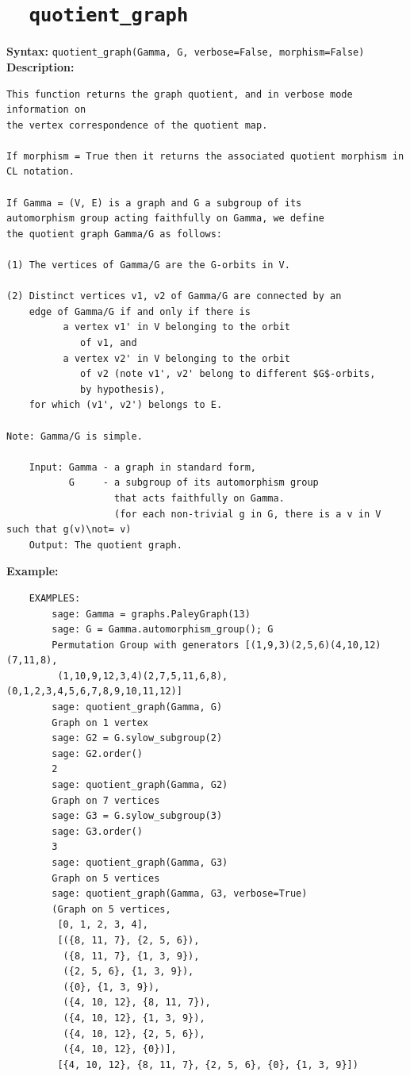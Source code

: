 \documentclass{article}
\begin{document}
\section{\tt \ \ quotient\_graph}

\textbf{Syntax:} \verb}quotient_graph(Gamma, G, verbose=False, morphism=False)}\\

\textbf{Description:}
\begin{verbatim}
This function returns the graph quotient, and in verbose mode information on 
the vertex correspondence of the quotient map.

If morphism = True then it returns the associated quotient morphism in CL notation.

If Gamma = (V, E) is a graph and G a subgroup of its 
automorphism group acting faithfully on Gamma, we define 
the quotient graph Gamma/G as follows:
    
(1) The vertices of Gamma/G are the G-orbits in V. 
    
(2) Distinct vertices v1, v2 of Gamma/G are connected by an 
    edge of Gamma/G if and only if there is 
          a vertex v1' in V belonging to the orbit 
             of v1, and 
          a vertex v2' in V belonging to the orbit 
             of v2 (note v1', v2' belong to different $G$-orbits,
             by hypothesis), 
    for which (v1', v2') belongs to E.
    
Note: Gamma/G is simple.
    
    Input: Gamma - a graph in standard form,
           G     - a subgroup of its automorphism group
                   that acts faithfully on Gamma.
                   (for each non-trivial g in G, there is a v in V such that g(v)\not= v)
    Output: The quotient graph.
\end{verbatim}

\textbf{Example:}
\begin{verbatim}
    EXAMPLES:
        sage: Gamma = graphs.PaleyGraph(13)
        sage: G = Gamma.automorphism_group(); G
        Permutation Group with generators [(1,9,3)(2,5,6)(4,10,12)(7,11,8), 
         (1,10,9,12,3,4)(2,7,5,11,6,8), (0,1,2,3,4,5,6,7,8,9,10,11,12)]
        sage: quotient_graph(Gamma, G)
        Graph on 1 vertex
        sage: G2 = G.sylow_subgroup(2)
        sage: G2.order()
        2
        sage: quotient_graph(Gamma, G2)
        Graph on 7 vertices
        sage: G3 = G.sylow_subgroup(3)
        sage: G3.order()
        3
        sage: quotient_graph(Gamma, G3)
        Graph on 5 vertices
        sage: quotient_graph(Gamma, G3, verbose=True)
        (Graph on 5 vertices,
         [0, 1, 2, 3, 4],
         [({8, 11, 7}, {2, 5, 6}),
          ({8, 11, 7}, {1, 3, 9}),
          ({2, 5, 6}, {1, 3, 9}),
          ({0}, {1, 3, 9}),
          ({4, 10, 12}, {8, 11, 7}),
          ({4, 10, 12}, {1, 3, 9}),
          ({4, 10, 12}, {2, 5, 6}),
          ({4, 10, 12}, {0})],
         [{4, 10, 12}, {8, 11, 7}, {2, 5, 6}, {0}, {1, 3, 9}])
\end{verbatim}
\end{document}
